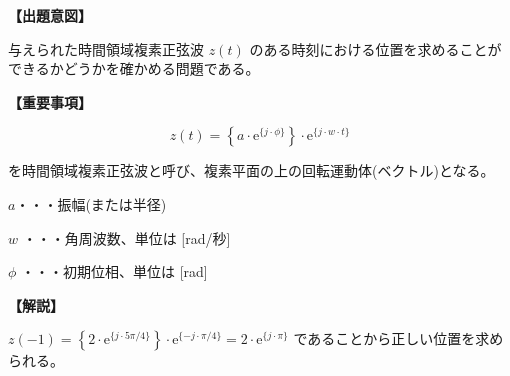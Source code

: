 \noindent \textbf{【出題意図】}

\bigskip
\noindent 与えられた時間領域複素正弦波 $z(t)$ のある時刻における位置を求めることができるかどうかを確かめる問題である。

\vspace{1em}
\noindent \textbf{【重要事項】}

\[
z(t) =  \left \{ a \cdot \textrm{e}^{\{j \cdot \phi\}} \right \} 
\cdot \textrm{e}^{\{j \cdot w \cdot t \}}
\]

\bigskip
\noindent を時間領域複素正弦波と呼び、複素平面の上の回転運動体(ベクトル)となる。

\bigskip
\noindent\quad  $a$・・・振幅(または半径)

\bigskip
\noindent\quad $w$ ・・・角周波数、単位は [rad/秒]

\bigskip
\noindent\quad $\phi$ ・・・初期位相、単位は [rad]

\bigskip

\vspace{1em}
\noindent \textbf{【解説】}

\bigskip
\noindent 
$z(-1) =  \left \{ 2 \cdot \textrm{e}^{\{j \cdot 5\pi/4 \}} \right \} \cdot \textrm{e}^{\{ -j \cdot \pi/4 \}} = 2 \cdot \textrm{e}^{\{ j \cdot \pi \}}$ であることから正しい位置を求められる。
